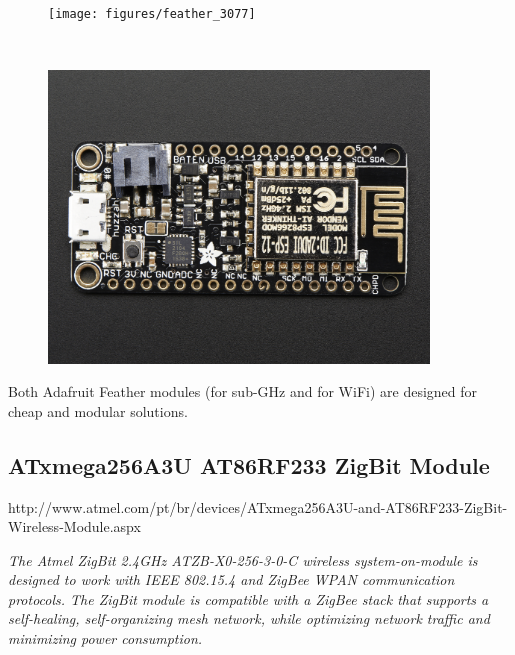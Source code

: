 
\vspace{-1em}
\begin{figure}[h!]
	\centering
	\begin{minipage}{.47\textwidth}
		\centering

		\texttt{[image: figures/feather\_3077]}

		\label{fig:test3}
	\end{minipage}%
	\begin{minipage}{.05\textwidth}
		\centering
		~
	\end{minipage}%
	\begin{minipage}{.47\textwidth}
		\centering
		\includegraphics[width=0.90\textwidth,keepaspectratio]{figures/feather_wifi}
		\label{fig:test4}
	\end{minipage}
\end{figure}

Both Adafruit Feather modules (for sub-GHz and for WiFi) are designed for cheap and modular solutions.

\subsection{ATxmega256A3U AT86RF233 ZigBit Module}

\begin{framed}
	
	http://www.atmel.com/pt/br/devices/ATxmega256A3U-and-AT86RF233-ZigBit-Wireless-Module.aspx
	
	\vspace{1em}
	\vspace{1em}
\small	
	\textit{The Atmel ZigBit 2.4GHz ATZB-X0-256-3-0-C wireless system-on-module is designed to work with IEEE 802.15.4 and ZigBee WPAN communication protocols. The ZigBit module is compatible with a ZigBee stack that supports a self-healing, self-organizing mesh network, while optimizing network traffic and minimizing power consumption.}
\end{framed}

